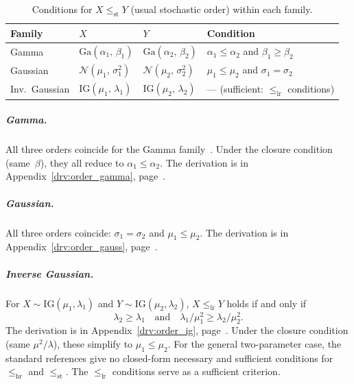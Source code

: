 \documentclass[11pt,a4paper]{article}
\theoremstyle{plain}
\theoremstyle{definition}
\theoremstyle{remark}
\begin{document}
\begin{table}[htbp]
\centering
\caption{Conditions for $X \le_{\mathrm{st}} Y$ (usual stochastic order) within each family.}
\label{tab:ordering_st}
\small
\begin{tabularx}{\linewidth}{@{}>{\hsize=0.604\hsize\raggedright\arraybackslash}X>{\hsize=1.094\hsize\raggedright\arraybackslash}X>{\hsize=1.151\hsize\raggedright\arraybackslash}X>{\hsize=1.151\hsize\raggedright\arraybackslash}X@{}}
\toprule
\rowcolor{headgrey}
\textbf{Family} & $X$ & $Y$ & \textbf{Condition} \\
\midrule
Gamma
  & $\mathrm{Ga}(\alpha_1,\,\beta_1)$
  & $\mathrm{Ga}(\alpha_2,\,\beta_2)$
  & $\alpha_1 \le \alpha_2$ and $\beta_1 \ge \beta_2$ \\[4pt]
Gaussian
  & $\mathcal{N}(\mu_1,\,\sigma_1^2)$
  & $\mathcal{N}(\mu_2,\,\sigma_2^2)$
  & $\mu_1 \le \mu_2$ and $\sigma_1 = \sigma_2$ \\[4pt]
Inv.\ Gaussian
  & $\mathrm{IG}(\mu_1,\,\lambda_1)$
  & $\mathrm{IG}(\mu_2,\,\lambda_2)$
  & --- (sufficient: $\le_{\mathrm{lr}}$ conditions) \\[4pt]
\bottomrule
\end{tabularx}
\end{table}

\subparagraph{Gamma.}
All three orders coincide for the Gamma family~\cite[Sec.~1.C]{ShakedShanthikumar2007}.
Under the closure condition (same~$\beta$), they all reduce to $\alpha_1 \le \alpha_2$.
The derivation is in Appendix~\ref{drv:order_gamma}, page~\pageref{drv:order_gamma}.

\subparagraph{Gaussian.}
All three orders coincide: $\sigma_1 = \sigma_2$ and $\mu_1 \le \mu_2$.
The derivation is in Appendix~\ref{drv:order_gauss}, page~\pageref{drv:order_gauss}.

\subparagraph{Inverse Gaussian.}
For $X \sim \mathrm{IG}(\mu_1,\lambda_1)$ and $Y \sim \mathrm{IG}(\mu_2,\lambda_2)$, $X \le_{\mathrm{lr}} Y$ holds if and only if
\begin{equation}
  \lambda_2 \ge \lambda_1
  \quad\text{and}\quad
  \lambda_1/\mu_1^2 \ge \lambda_2/\mu_2^2.
\end{equation}
The derivation is in Appendix~\ref{drv:order_ig}, page~\pageref{drv:order_ig}.
Under the closure condition (same $\mu^2/\lambda$), these simplify to $\mu_1 \le \mu_2$.
For the general two-parameter case, the standard references give no closed-form necessary and sufficient conditions for $\le_{\mathrm{hr}}$ and $\le_{\mathrm{st}}$.
The $\le_{\mathrm{lr}}$ conditions serve as a sufficient criterion.
\end{document}
